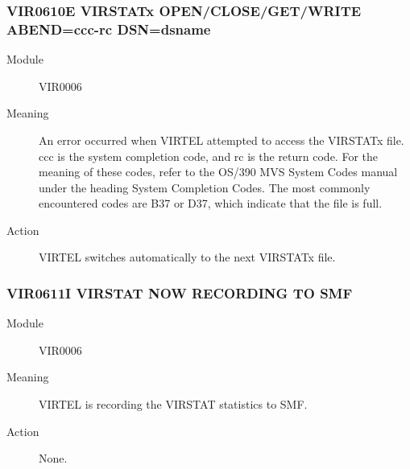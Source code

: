 \documentclass[letterpaper,10pt,english]{sphinxmanual}
\begin{document}
\subsubsection{VIR0610E VIRSTATx OPEN/CLOSE/GET/WRITE ABEND=ccc-rc DSN=dsname}
\label{\detokenize{messages:vir0610e-virstatx-open-close-get-write-abend-ccc-rc-dsn-dsname}}\begin{description}
\item[{Module}] \leavevmode
VIR0006

\item[{Meaning}] \leavevmode
An error occurred when VIRTEL attempted to access the VIRSTATx file. ccc is the system completion code, and rc is the return code. For the meaning of these codes, refer to the OS/390 MVS System Codes manual under the heading System Completion Codes. The most commonly encountered codes are B37 or D37, which indicate that the file is full.

\item[{Action}] \leavevmode
VIRTEL switches automatically to the next VIRSTATx file.

\end{description}


\subsubsection{VIR0611I VIRSTAT NOW RECORDING TO SMF}
\label{\detokenize{messages:vir0611i-virstat-now-recording-to-smf}}\begin{description}
\item[{Module}] \leavevmode
VIR0006

\item[{Meaning}] \leavevmode
VIRTEL is recording the VIRSTAT statistics to SMF.

\item[{Action}] \leavevmode
None.

\end{description}
\end{document}
